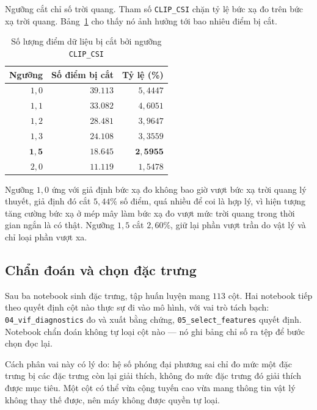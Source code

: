 \documentclass[12pt, a4paper]{report}
\begin{document}
Ngưỡng cắt chỉ số trời quang. Tham số \texttt{CLIP\_CSI} chặn tỷ lệ bức xạ đo trên bức xạ
trời quang. Bảng~\ref{tab:clip_csi} cho thấy nó ảnh hưởng tới bao nhiêu điểm bị cắt.

\begin{table}[htbp]
\centering
\caption{Số lượng điểm dữ liệu bị cắt bởi ngưỡng \texttt{CLIP\_CSI}}
\label{tab:clip_csi}
\small
\begin{tabular}{r r r}
\toprule
\textbf{Ngưỡng} & \textbf{Số điểm bị cắt} & \textbf{Tỷ lệ (\%)} \\
\midrule
$1{,}0$ & $39.113$ & $5{,}4447$ \\
$1{,}1$ & $33.082$ & $4{,}6051$ \\
$1{,}2$ & $28.481$ & $3{,}9647$ \\
$1{,}3$ & $24.108$ & $3{,}3559$ \\
$\mathbf{1{,}5}$ & $\mathbf{18.645}$ & $\mathbf{2{,}5955}$ \\
$2{,}0$ & $11.119$ & $1{,}5478$ \\
\bottomrule
\end{tabular}


\end{table}

Ngưỡng $1{,}0$ ứng với giả định bức xạ đo không bao giờ vượt bức xạ trời quang lý thuyết,
giả định đó cắt $5{,}44\%$ số điểm, quá nhiều để coi là hợp lý, vì hiện tượng tăng cường bức
xạ ở mép mây làm bức xạ đo vượt mức trời quang trong thời gian ngắn là có thật. Ngưỡng
$1{,}5$ cắt $2{,}60\%$, giữ lại phần vượt trần do vật lý và chỉ loại phần vượt xa.

\FloatBarrier
\subsection{Chẩn đoán và chọn đặc trưng}
\label{subsec:chan_doan_dac_trung}

Sau ba notebook sinh đặc trưng, tập huấn luyện mang $113$ cột. Hai notebook tiếp theo quyết định
cột nào thực sự đi vào mô hình, với vai trò tách bạch: \texttt{04\_vif\_diagnostics} đo và
xuất bằng chứng, \texttt{05\_select\_features} quyết định. Notebook chẩn đoán không tự loại
cột nào --- nó ghi bảng chỉ số ra tệp để bước chọn đọc lại.

Cách phân vai này có lý do: hệ số phóng đại phương sai chỉ đo mức một đặc trưng bị các đặc trưng
còn lại giải thích, không đo mức đặc trưng đó giải thích được mục tiêu. Một cột có thể vừa cộng
tuyến cao vừa mang thông tin vật lý không thay thế được, nên máy không được quyền tự loại.
\end{document}
